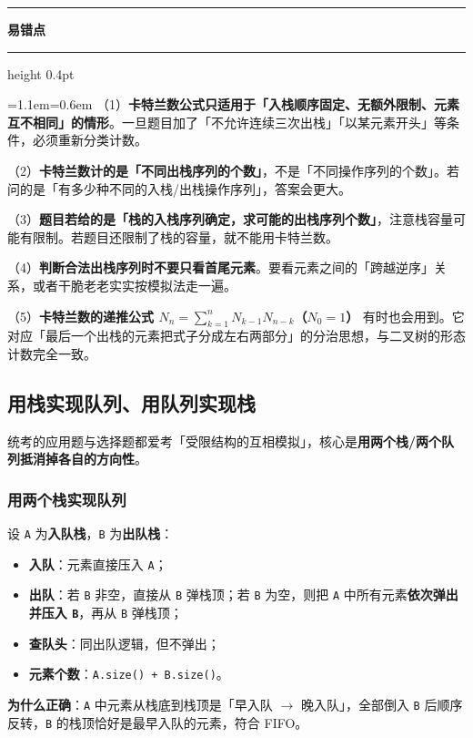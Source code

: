 \documentclass[11pt,openany,UTF8]{ctexbook}
\newcommand{\callouthead}[2]{%
  \par\addvspace{7pt}\noindent
  {\color{#1}\rule[-0.15em]{3pt}{1.05em}}\hspace{0.5em}%
  {\bfseries\color{#1}#2}\par\nobreak\vspace{-0.35em}%
  {\color{rulesep}\hrule height 0.4pt}\nobreak\vspace{0.45em}%
  \begingroup\small\setlength{\parindent}{0pt}%
  \leftskip=1.1em\rightskip=0.6em\noindent\ignorespaces}
\newcommand{\calloutend}{\par\endgroup\addvspace{7pt}}
\newenvironment{callwarn}[1]{\callouthead{warnbar}{#1}}{\calloutend}
\begin{document}
\begin{callwarn}{易错点}
（1）\textbf{卡特兰数公式只适用于「入栈顺序固定、无额外限制、元素互不相同」的情形}。一旦题目加了「不允许连续三次出栈」「以某元素开头」等条件，必须重新分类计数。

（2）\textbf{卡特兰数计的是「不同出栈序列的个数」}，不是「不同操作序列的个数」。若问的是「有多少种不同的入栈/出栈操作序列」，答案会更大。

（3）\textbf{题目若给的是「栈的入栈序列确定，求可能的出栈序列个数」}，注意栈容量可能有限制。若题目还限制了栈的容量，就不能用卡特兰数。

（4）\textbf{判断合法出栈序列时不要只看首尾元素}。要看元素之间的「跨越逆序」关系，或者干脆老老实实按模拟法走一遍。

（5）\textbf{卡特兰数的递推公式 $N_n = \sum_{k=1}^{n} N_{k-1} N_{n-k}$（$N_0 = 1$）} 有时也会用到。它对应「最后一个出栈的元素把式子分成左右两部分」的分治思想，与二叉树的形态计数完全一致。

\end{callwarn}

\subsection{用栈实现队列、用队列实现栈}

统考的应用题与选择题都爱考「受限结构的互相模拟」，核心是\textbf{用两个栈/两个队列抵消掉各自的方向性}。

\subsubsection{用两个栈实现队列}

设 \texttt{A} 为\textbf{入队栈}，\texttt{B} 为\textbf{出队栈}：

\begin{itemize}
\item \textbf{入队}：元素直接压入 \texttt{A}；
\item \textbf{出队}：若 \texttt{B} 非空，直接从 \texttt{B} 弹栈顶；若 \texttt{B} 为空，则把 \texttt{A} 中所有元素\textbf{依次弹出并压入 \texttt{B}}，再从 \texttt{B} 弹栈顶；
\item \textbf{查队头}：同出队逻辑，但不弹出；
\item \textbf{元素个数}：\texttt{A.size()\allowbreak{} +\allowbreak{} B.size()\allowbreak{}}。
\end{itemize}
\textbf{为什么正确}：\texttt{A} 中元素从栈底到栈顶是「早入队 $\to$ 晚入队」，全部倒入 \texttt{B} 后顺序反转，\texttt{B} 的栈顶恰好是最早入队的元素，符合 FIFO。
\end{document}
